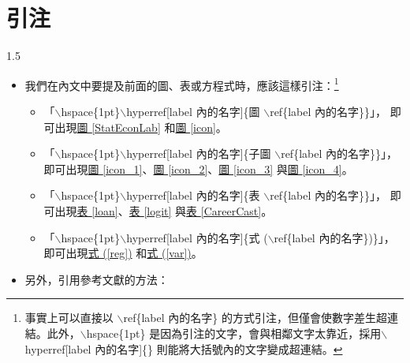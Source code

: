 \documentclass[utf8,12pt]{article} %
\begin{document}
\section{引注}
%
%
\begin{spacing}{1.5}
%
\begin{itemize}
	\item 我們在內文中要提及前面的圖、表或方程式時，應該這樣引注：\footnote{事實上可以直接以 $\backslash$ref\{label 內的名字\} 的方式引注，但僅會使數字差生超連結。此外，$\backslash$hspace\{1pt\} 是因為引注的文字，會與相鄰文字太靠近，採用$\backslash$hyperref[label 內的名字]\{\} 則能將大括號內的文字變成超連結。}
	\begin{itemize}
		\item 「$\backslash$hspace\{1pt\}$\backslash$hyperref[label 內的名字]\{圖 $\backslash$ref\{label 內的名字\}\}」，
			即可出現\hspace{1pt}\hyperref[StatEconLab]{圖 \ref{StatEconLab}} 和\hspace{1pt}\hyperref[icon]{圖 \ref{icon}}。
		\item 「$\backslash$hspace\{1pt\}$\backslash$hyperref[label 內的名字]\{子圖 $\backslash$ref\{label 內的名字\}\}」，
			即可出現\hspace{1pt}\hyperref[icon]{圖 \ref{icon_1}}、\hspace{1pt}\hyperref[icon]{圖 \ref{icon_2}}、\hspace{1pt}\hyperref[icon]{圖 \ref{icon_3}} 與\hspace{1pt}\hyperref[icon]{圖 \ref{icon_4}}。
		\item 「$\backslash$hspace\{1pt\}$\backslash$hyperref[label 內的名字]\{表 $\backslash$ref\{label 內的名字\}\}」，
			即可出現\hspace{1pt}\hyperref[loan]{表 \ref{loan}}、\hspace{1pt}\hyperref[logit]{表 \ref{logit}} 與\hspace{1pt}\hyperref[CareerCast]{表 \ref{CareerCast}}。
		\item 「$\backslash$hspace\{1pt\}$\backslash$hyperref[label 內的名字]\{式 ($\backslash$ref\{label 內的名字\})\}」，
				即可出現\hspace{1pt}\hyperref[reg]{式 (\ref{reg})} 和\hspace{1pt}\hyperref[reg]{式 (\ref{var})}。
	\end{itemize}
	\item 另外，引用參考文獻的方法：
	\begin{itemize}

\end{itemize}
\end{itemize}
\end{spacing}
\end{document}
